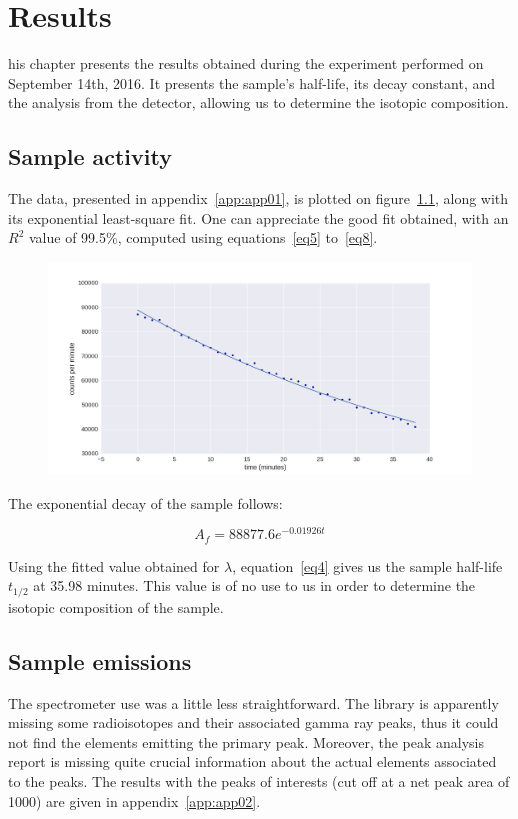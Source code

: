%
%
\let\textcircled=\pgftextcircled
\chapter{Results}
\label{chap:result}

his chapter presents the results obtained during the experiment performed on September 14th, 2016. It presents the sample's half-life, its decay constant, and the analysis from the detector, allowing us to determine the isotopic composition.

\section{Sample activity}

The data, presented in appendix~\ref{app:app01}, is plotted on figure~\ref{fig:actsample}, along with its exponential least-square fit. One can appreciate the good fit obtained, with an $R^2$ value of 99.5\%, computed using equations~\ref{eq5} to~\ref{eq8}.

\begin{figure}[t!]
	\centering
	\includegraphics[height=0.4\textheight]{fig02/plot.png}
	\label{fig:actsample}
\end{figure}

The exponential decay of the sample follows:

\begin{equation}\label{eq9}
{A_f} = 88877.6 e^{- 0.01926 t}
\end{equation}

Using the fitted value obtained for $\lambda$, equation~\ref{eq4} gives us the sample half-life $t_{1/2}$ at 35.98 minutes. This value is of no use to us in order to determine the isotopic composition of the sample.

\section{Sample emissions}

The spectrometer use was a little less straightforward. The library is apparently missing some radioisotopes and their associated gamma ray peaks, thus it could not find the elements emitting the primary peak. Moreover, the peak analysis report is missing quite crucial information about the actual elements associated to the peaks. The results with the peaks of interests (cut off at a net peak area of 1000) are given in appendix~\ref{app:app02}.
